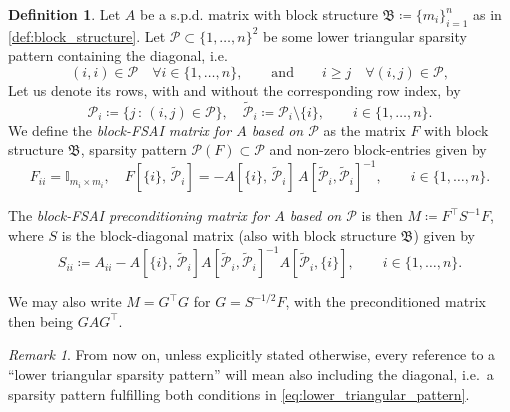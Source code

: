 \documentclass[a4paper]{article}
\theoremstyle{plain}
\theoremstyle{definition}
\newtheorem{definition}{Definition}[section]
\theoremstyle{remark}
\newtheorem{remark}{Remark}[section]
\begin{document}
\begin{definition}\label{def:fsai_matrices}
	Let \(A\) be a s.p.d. matrix with block structure \(\mathfrak{B} \coloneqq \{m_i\}_{i=1}^n\) as in \cref{def:block_structure}. Let \(\mathcal{P} \subset \{1,\dots,n\}^2\) be some lower triangular sparsity pattern containing the diagonal, i.e.
	\begin{equation}\label{eq:lower_triangular_pattern}
		(i, i) \in \mathcal{P} \quad \forall i \in \{1, \dots, n\},\qquad \text{and} \qquad i \geq j \quad \forall (i, j) \in \mathcal{P},
	\end{equation}
	Let us denote its rows, with and without the corresponding row index, by
	\begin{equation*}
		\mathcal{P}_i \coloneqq \{j \,\colon\, (i,j)\in \mathcal{P}\}, \quad \tilde{\mathcal{P}}_i \coloneqq \mathcal{P}_i \setminus \{i\}, \qquad i \in \{1,\dots,n\}.
	\end{equation*}
	We define the \emph{block-FSAI matrix for \(A\) based on \(\mathcal{P}\)} as the matrix \(F\) with block structure \(\mathfrak{B}\), sparsity pattern \(\mathcal{P}(F)\subset\mathcal{P}\) and non-zero block-entries given by
	\begin{equation}\label{eq:fsai_f_definition}
		F_{ii} = \mathbb{I}_{m_i \times m_i}, \quad F[\{i\}, \, \tilde{\mathcal{P}}_i] = - A[\{i\},\, \tilde{\mathcal{P}}_i]\, A[\tilde{\mathcal{P}}_i, \tilde{\mathcal{P}}_i]^{-1}, \qquad i \in \{1,\dots,n\}.
	\end{equation}
	
	The \emph{block-FSAI preconditioning matrix for \(A\) based on \(\mathcal{P}\)} is then \(M \coloneqq F^{\top} S^{-1} F\), where \(S\) is the block-diagonal matrix (also with block structure \(\mathfrak{B}\)) given by
	\begin{equation}\label{eq:schur_complement_fsai}
		S_{ii} \coloneqq A_{ii} - A[\{i\},\, \tilde{\mathcal{P}}_i] A[\tilde{\mathcal{P}}_i, \tilde{\mathcal{P}}_i]^{-1} A[\tilde{\mathcal{P}}_i, \{i\}], \qquad i \in \{1,\dots,n\}.
	\end{equation}
	
	We may also write \(M = G^{\top} G\) for \(G = S^{-1/2} F\), with the preconditioned matrix then being \(G A G^{\top}\).
\end{definition}

\begin{remark}
	From now on, unless explicitly stated otherwise, every reference to a ``lower triangular sparsity pattern'' will mean also including the diagonal, i.e.\ a sparsity pattern fulfilling both conditions in \eqref{eq:lower_triangular_pattern}.
\end{remark}
\end{document}
